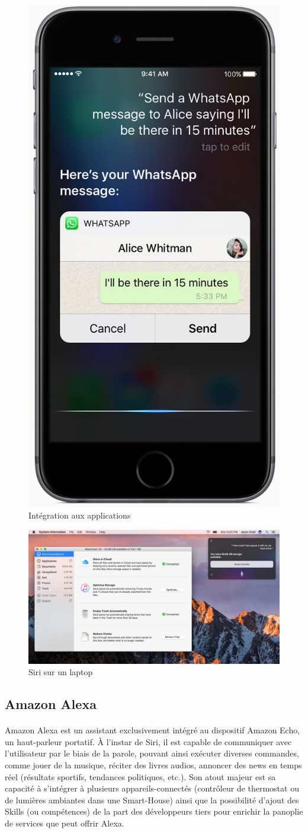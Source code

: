 \begin{figure}[H] 
	\centering
	\includegraphics[width=.25\linewidth]{images/apple_siri/whatsapp.jpg} 
	\caption{Intégration aux applications \citep{siriDemo}}
	\label{fig:whatsapp}
\end{figure}


\begin{figure}[H]
	\centering
	\includegraphics[width=0.75\linewidth]{images/apple_siri/macbook.png} 
	\caption{Siri sur un laptop  \citep{macossiridemo}}
	\label{fig:macbooksiri}
	
\end{figure}


\subsection{Amazon Alexa}\label{alexa}
\paragraph{}Amazon Alexa est un assistant exclusivement intégré au dispositif Amazon Echo, un haut-parleur portatif. À l'instar de Siri, il est capable de communiquer avec l'utilisateur par le biais de la parole, pouvant ainsi exécuter diverses commandes, comme jouer de la musique, réciter des livres audios, annoncer des news en temps réel (résultats sportifs, tendances politiques, etc.). Son atout majeur est sa capacité à s'intégrer à plusieurs appareils-connectés (contrôleur de thermostat ou de lumières ambiantes dans une Smart-House) ainsi que la possibilité d'ajout des Skills (ou compétences) de la part des développeurs tiers pour enrichir la panoplie de services que peut offrir Alexa.


